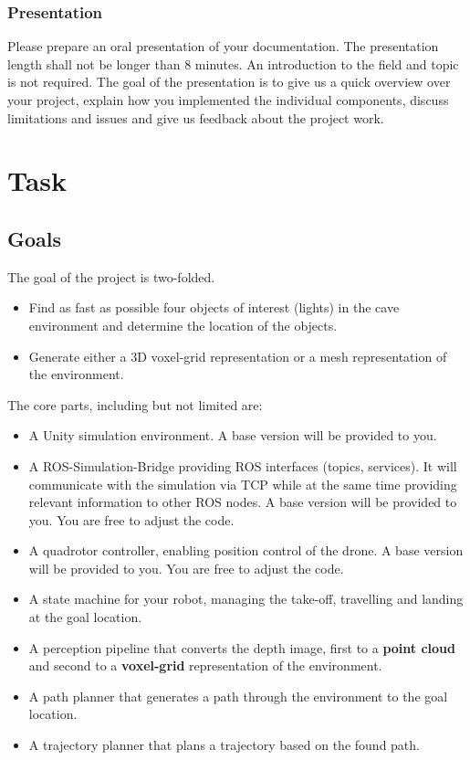 \documentclass{article}
\begin{document}
\subsubsection{Presentation}
Please prepare an oral presentation of your documentation. The presentation length shall not be longer than 8 minutes. An introduction to the field and topic is not required. The goal of the presentation is to give us a quick overview over your project, explain how you implemented the individual components, discuss limitations and issues and give us feedback about the project work.

\section{Task}
\subsection{Goals}
The goal of the project is two-folded.

\begin{itemize}
\item Find as fast as possible four objects of interest (lights) in the cave environment and determine the location of the objects.
\item Generate either a 3D voxel-grid representation or a mesh representation of the environment.
\end{itemize}

The core parts, including but not limited are:
\begin{itemize}
\item A Unity simulation environment. A base version will be provided to you.
\item A ROS-Simulation-Bridge providing ROS interfaces (topics, services). It will communicate with the simulation via TCP while at the same time providing relevant information to other ROS nodes. A base version will be provided to you. You are free to adjust the code.
\item A quadrotor controller, enabling position control of the drone. A base version will be provided to you. You are free to adjust the code.
\item A state machine for your robot, managing the take-off, travelling and landing at the goal location.
\item A perception pipeline that converts the depth image, first to a \textbf{point cloud} and second to a \textbf{voxel-grid} representation of the environment.
\item A path planner that generates a path through the environment to the goal location.
\item A trajectory planner that plans a trajectory based on the found path.
\end{itemize}
\end{document}
